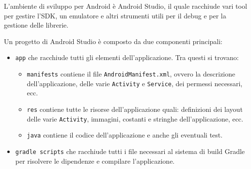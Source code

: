 L'ambiente di sviluppo per Android è Android Studio, il quale racchiude
vari tool per gestire l'SDK, un emulatore e altri strumenti utili per il
debug e per la gestione delle librerie.

Un progetto di Android Studio è composto da due componenti principali:

\begin{itemize}
	\item
		\texttt{app} che racchiude tutti gli elementi dell'applicazione. Tra
		questi si trovano:
	\begin{itemize}
		\item \texttt{manifests} contiene il file \texttt{AndroidManifest.xml}, ovvero la
			descrizione dell'applicazione, delle varie \texttt{Activity} e \texttt{Service}, dei
			permessi necessari, ecc.
		\item \texttt{res} contiene tutte le risorse dell'applicazione quali:
			definizioni dei layout delle varie \texttt{Activity}, immagini, costanti e
			stringhe dell'applicazione, ecc.
		\item \texttt{java} contiene il codice dell'applicazione e anche gli
			eventuali test.
	\end{itemize}
	\item \texttt{gradle scripts} che racchiude tutti i file necessari al
		sistema di build Gradle per risolvere le dipendenze e compilare
		l'applicazione.
\end{itemize}

